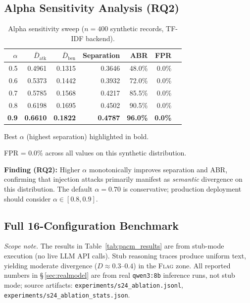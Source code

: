 \documentclass[11pt,letterpaper]{article}
\begin{document}
\subsection{Alpha Sensitivity Analysis (RQ2)}
\label{sec:alpha}

\begin{table}[htbp]
\centering
\caption{Alpha sensitivity sweep ($n=400$ synthetic records, TF-IDF backend).}
\label{tab:alpha}
\begin{tabular}{rrrrrrr}
\toprule
$\alpha$ & $\bar{D}_{\mathrm{atk}}$ & $\bar{D}_{\mathrm{ben}}$
         & Separation & ABR & FPR \\
\midrule
0.5 & 0.4961 & 0.1315 & 0.3646 & 48.0\% & 0.0\% \\
0.6 & 0.5373 & 0.1442 & 0.3932 & 72.0\% & 0.0\% \\
0.7 & 0.5785 & 0.1568 & 0.4217 & 85.5\% & 0.0\% \\
0.8 & 0.6198 & 0.1695 & 0.4502 & 90.5\% & 0.0\% \\
\textbf{0.9} & \textbf{0.6610} & \textbf{0.1822} & \textbf{0.4787}
             & \textbf{96.0\%} & \textbf{0.0\%} \\
\bottomrule
\end{tabular}
\begin{tablenotes}\small
  \item Best $\alpha$ (highest separation) highlighted in bold.
  \item FPR = 0.0\% across all values on this synthetic distribution.
\end{tablenotes}
\end{table}

\textbf{Finding (RQ2):} Higher $\alpha$ monotonically improves separation and
ABR, confirming that injection attacks primarily manifest as \emph{semantic}
divergence on this distribution. The default $\alpha = 0.70$ is conservative;
production deployment should consider $\alpha \in [0.8, 0.9]$.

\subsection{Full 16-Configuration Benchmark}
\label{sec:sweep}

\noindent\textit{Scope note.} The results in Table~\ref{tab:pacm_results} are
from stub-mode execution (no live LLM API calls). Stub reasoning traces produce
uniform text, yielding moderate divergence ($D \approx 0.3$--$0.4$) in the
\textsc{Flag} zone. All reported numbers in \S\,\ref{sec:realmodel} are from
real \texttt{qwen3:8b} inference runs, not stub mode; source artifacts:
\texttt{experiments/s24\_ablation.jsonl}, \texttt{experiments/s24\_ablation\_stats.json}.
\end{document}
